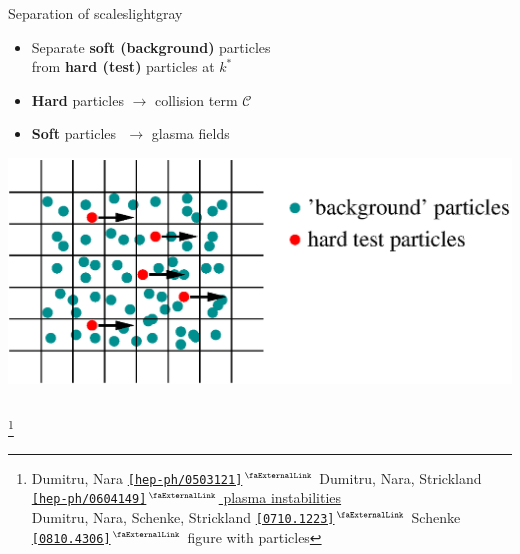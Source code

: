 \documentclass[aspectratio=169,11pt,usenames,dvipsnames]{beamer}
\renewcommand{\thefootnote}{\color{customblue}\faPaperPlaneO}
\newcommand\blfootnote[1]{%
  \begingroup
  \renewcommand\thefootnote{}\footnote{#1}%
  \addtocounter{footnote}{-1}%
  \endgroup
}
\begin{document}
\begin{frame}
\begin{center}
\begin{columns}[onlytextwidth,t]
            \begin{center}
                \begin{custombox2}{\normalsize Separation of scales}{lightgray}
                    \small
                    \begin{varwidth}{0.93\textwidth}
                    \begin{itemize}\itemsep0em 
                        \itemsep0em
                        \footnotesize
                        \item Separate {\bfseries\color{palteal} soft (background)} particles \\ from {\bfseries\color{jyured}hard (test)} particles at $k^*$
                        \item {\bfseries\color{jyured}Hard} particles $\rightarrow$ collision term $\mathcal{C}$
                        \item {\bfseries\color{palteal}Soft} particles $\,\,\rightarrow$ glasma fields 
                    \end{itemize}
                    \end{varwidth}
                \end{custombox2}
                \includegraphics[width=0.9\columnwidth]{images/jets.eps}
            \end{center}
        \end{columns}    
    \end{center}
    \vspace{-10pt}
    \blfootnote{\scriptsize Dumitru, Nara \href{https://arxiv.org/abs/hep-ph/0503121}{{\color{palteal}\texttt{[hep-ph/0503121]$^\text{\scalebox{0.9}{\faExternalLink}}$}}} Dumitru, Nara, Strickland \href{https://arxiv.org/abs/hep-ph/0604149}{{\color{palteal}\texttt{[hep-ph/0604149]$^\text{\scalebox{0.9}{\faExternalLink}}$}} \color{normal}plasma instabilities}\\
     \hspace{16.5pt}Dumitru, Nara, Schenke, Strickland \href{https://arxiv.org/abs/0710.1223}{{\color{palteal}\texttt{[0710.1223]$^\text{\scalebox{0.9}{\faExternalLink}}$}}} Schenke \href{https://arxiv.org/abs/0810.4306}{{\color{palteal}\texttt{[0810.4306]$^\text{\scalebox{0.9}{\faExternalLink}}$}}} figure with particles}
\end{frame}
\end{document}
